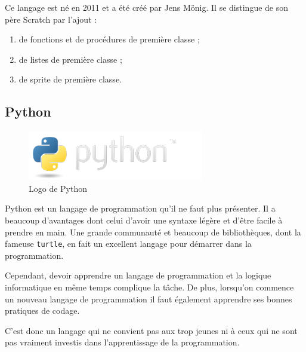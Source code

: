 Ce langage est né en 2011 et a été créé par Jens Mönig. Il se distingue de son père Scratch par l'ajout :
\begin{enumerate}
\item de fonctions et de procédures de première classe ;
\item de listes de première classe ;
\item de sprite de première classe.
\end{enumerate}

\subsection{Python}
\begin{figure}[!h]
  \begin{center}
    \includegraphics[scale=0.4]{content/5-related_work/images/python}
    \caption{Logo de Python}
    \label{fig:python}
  \end{center}
\end{figure}
Python est un langage de programmation qu'il ne faut plus présenter. Il a beaucoup d'avantages dont celui d'avoir une syntaxe légère et d'être facile à prendre en main. Une grande communauté et beaucoup de bibliothèques, dont la fameuse \texttt{turtle}, en fait un excellent langage pour démarrer dans la programmation.

Cependant, devoir apprendre un langage de programmation et la logique informatique en même temps complique la tâche. De plus, lorsqu'on commence un nouveau langage de programmation il faut également apprendre ses bonnes pratiques de codage.

C'est donc un langage qui ne convient pas aux trop jeunes ni à ceux qui ne sont pas vraiment investis dans l'apprentissage de la programmation.
